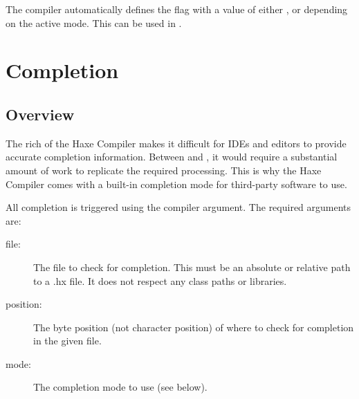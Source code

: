 The compiler automatically defines the flag  with a value of either ,  or  depending on the active mode. This can be used in .






\section{Completion}
\label{cr-completion}

\subsection{Overview}
\label{cr-completion-overview}

The rich  of the Haxe Compiler makes it difficult for IDEs and editors to provide accurate completion information. Between  and , it would require a substantial amount of work to replicate the required processing. This is why the Haxe Compiler comes with a built-in completion mode for third-party software to use.

All completion is triggered using the  compiler argument. The required arguments are:

\begin{description}
	\item[file:] The file to check for completion. This must be an absolute or relative path to a .hx file. It does not respect any class paths or libraries.
	\item[position:] The byte position (not character position) of where to check for completion in the given file.
	\item[mode:] The completion mode to use (see below).
\end{description}

